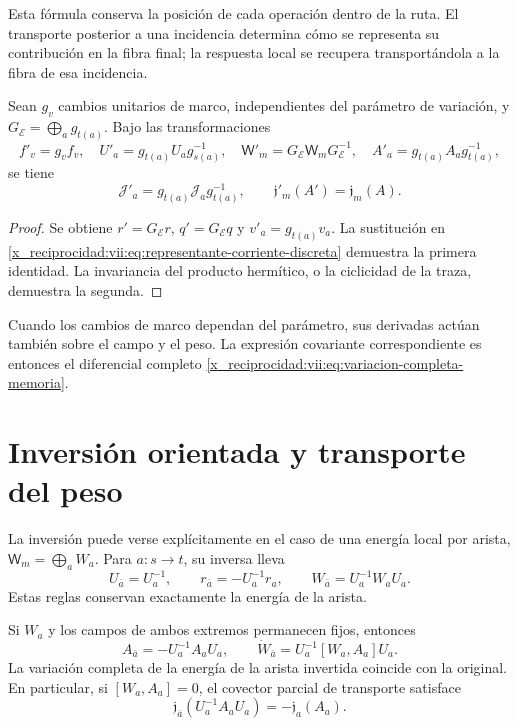 Esta fórmula conserva la posición de cada operación dentro de la ruta.
El transporte posterior a una incidencia determina cómo se representa
su contribución en la fibra final; la respuesta local se recupera
transportándola a la fibra de esa incidencia.

\begin{proposition}
\label{x_reciprocidad:vii:prop:covariancia-corriente-memoria}
Sean \(g_v\) cambios unitarios de marco, independientes del parámetro
de variación, y \(G_{\mathcal E}=\bigoplus_a g_{t(a)}\).
Bajo las transformaciones
\[
 f'_v=g_vf_v,\quad U'_a=g_{t(a)}U_ag_{s(a)}^{-1},\quad
 \mathsf W'_m=G_{\mathcal E}\mathsf W_mG_{\mathcal E}^{-1},\quad
 A'_a=g_{t(a)}A_ag_{t(a)}^{-1},
\]
se tiene
\begin{equation}
 \mathcal J'_a=g_{t(a)}\mathcal J_ag_{t(a)}^{-1},
 \qquad \mathfrak j'_m(A')=\mathfrak j_m(A).
 \label{x_reciprocidad:vii:eq:covariancia-respuesta}
\end{equation}
\end{proposition}

\begin{proof}
Se obtiene \(r'=G_{\mathcal E}r\), \(q'=G_{\mathcal E}q\) y
\(v'_a=g_{t(a)}v_a\). La sustitución en
\eqref{x_reciprocidad:vii:eq:representante-corriente-discreta} demuestra la primera
identidad. La invariancia del producto hermítico, o la ciclicidad de
la traza, demuestra la segunda.
\end{proof}

Cuando los cambios de marco dependan del parámetro, sus derivadas
actúan también sobre el campo y el peso. La expresión covariante
correspondiente es entonces el diferencial completo
\eqref{x_reciprocidad:vii:eq:variacion-completa-memoria}.

\section{Inversión orientada y transporte del peso}
\label{x_reciprocidad:vii:subsec:inversion-respuesta}

La inversión puede verse explícitamente en el caso de una energía
local por arista, \(\mathsf W_m=\bigoplus_a W_a\).
Para \(a:s\to t\), su inversa lleva
\[
 U_{\bar a}=U_a^{-1},\qquad
 r_{\bar a}=-U_a^{-1}r_a,\qquad
 W_{\bar a}=U_a^{-1}W_aU_a.
\]
Estas reglas conservan exactamente la energía de la arista.

\begin{proposition}
\label{x_reciprocidad:vii:prop:inversion-respuesta}
Si \(W_a\) y los campos de ambos extremos permanecen fijos, entonces
\[
 A_{\bar a}=-U_a^{-1}A_aU_a,\qquad
 \dot W_{\bar a}=U_a^{-1}[W_a,A_a]U_a.
\]
La variación completa de la energía de la arista invertida coincide con
la original. En particular, si \([W_a,A_a]=0\), el covector parcial
de transporte satisface
\begin{equation}
 \mathfrak j_{\bar a}(U_a^{-1}A_aU_a)
 =-\mathfrak j_a(A_a).
 \label{x_reciprocidad:vii:eq:imparidad-transporte}
\end{equation}
\end{proposition}

